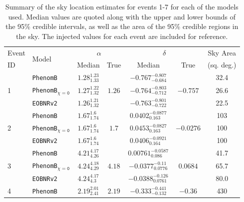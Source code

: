 \documentclass[12pt]{iopart}
\newcommand{\eob}{\texttt{EOBNRv2}\xspace}
\newcommand{\imr}{\texttt{PhenomB}\xspace}
\newcommand{\imrns}{\texttt{PhenomB$_\mathtt{\chi=0}$}\xspace}
\begin{document}
\begin{table}
  \caption{\label{extrinsicPEsummary}
      Summary of the sky location estimates for events 1-7 for each of the 
models used.  Median values are
      quoted along with the upper and lower bounds of the 95\% credible 
intervals, as well as the area of the
      95\% credible regions in the sky.  The injected values for each event are 
included for reference.}
  \begin{tabular}{|l|l||c|c||c|c||c|}
    \hline Event & \multirow{2}{*}{Model} &\multicolumn{2}{c||}{$\alpha$} & 
\multicolumn{2}{c||}{$\delta$} & Sky Area \\
    \cline{3-6} 
 ID & & Median & True & Median & True & (sq. deg.) \\
    \hline \hline
  \multirow{3}{*}{1} & \imr & $1.28^{1.23}_{1.33}$ & \multirow{3}{*}{$1.26$} & 
$-0.767^{-0.807}_{-0.684}$ & \multirow{3}{*}{$-0.757$} & 32.4 \\
    \cline{2-2}\cline{3-3} \cline{5-5}\cline{7-7}
& \imrns & $1.27^{1.22}_{1.32}$ & & $-0.764^{-0.803}_{-0.712}$ & & 26.6 \\
    \cline{2-2}\cline{3-3} \cline{5-5}\cline{7-7}
& \eob & $1.26^{1.21}_{1.32}$ & & $-0.763^{-0.801}_{-0.722}$ & & 22.5 \\
    \hline \hline
  \multirow{3}{*}{2} & \imr & $1.67^{1.6}_{1.74}$ & \multirow{3}{*}{$1.7$} & 
$0.0402^{-0.0877}_{0.163}$ & \multirow{3}{*}{$-0.0276$} & 103 \\
    \cline{2-2}\cline{3-3} \cline{5-5}\cline{7-7}
& \imrns & $1.67^{1.6}_{1.74}$ & & $0.0453^{-0.0827}_{0.163}$ & & 100 \\
    \cline{2-2}\cline{3-3} \cline{5-5}\cline{7-7}
& \eob & $1.67^{1.6}_{1.74}$ & & $0.0406^{-0.0921}_{0.164}$ & & 100 \\
    \hline \hline
  \multirow{3}{*}{3} & \imr & $4.21^{4.17}_{4.26}$ & \multirow{3}{*}{$4.18$} & 
$0.00761^{-0.0587}_{0.086}$ & \multirow{3}{*}{$0.0684$} & 41.7 \\
    \cline{2-2}\cline{3-3} \cline{5-5}\cline{7-7}
& \imrns & $4.24^{4.18}_{4.29}$ & & $-0.0377^{-0.11}_{0.0776}$ & & 65.7 \\
    \cline{2-2}\cline{3-3} \cline{5-5}\cline{7-7}
& \eob & $4.24^{4.17}_{4.3}$ & & $-0.0388^{-0.126}_{0.0761}$ & & 80.0 \\
    \hline \hline
  \multirow{3}{*}{4} & \imr & $2.19^{2.01}_{2.41}$ & \multirow{3}{*}{$2.19$} & 
$-0.333^{-0.441}_{-0.132}$ & \multirow{3}{*}{$-0.36$} & 430 \\
    \cline{2-2}\cline{3-3} \cline{5-5}\cline{7-7}

\end{tabular}
\end{table}
\end{document}
